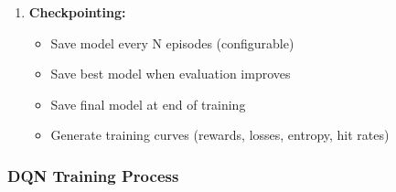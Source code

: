 \begin{enumerate}
\begin{enumerate}
\begin{itemize}
        \end{itemize}
        \item Log metrics (reward, length, loss, entropy)
        \item \textbf{Periodic Evaluation} (every N episodes, default 200):
        \begin{itemize}
            \item Run evaluation episodes without exploration
            \item Compute metrics: average reward, destruction rate, success rate, impact rate
            \item Track best performing model
            \item Save best model if performance improved
        \end{itemize}
    \end{enumerate}
    \item \textbf{Checkpointing:}
    \begin{itemize}
        \item Save model every N episodes (configurable)
        \item Save best model when evaluation improves
        \item Save final model at end of training
        \item Generate training curves (rewards, losses, entropy, hit rates)
    \end{itemize}
\end{enumerate}

\subsubsection{DQN Training Process}

